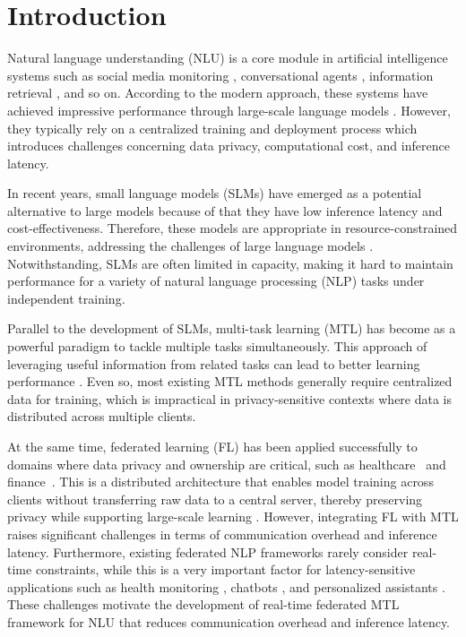 \section{Introduction} \label{sec:introduction}
Natural language understanding (NLU) is a core module in artificial intelligence systems such as social media monitoring \cite{arunkumar2025ai}, conversational agents \cite{manzo2025artificial}, information retrieval \cite{liu2025robust}, and so on. According to the modern approach, these systems have achieved impressive performance through large-scale language models \cite{devlin2019bert}. However, they typically rely on a centralized training and deployment process which introduces challenges concerning data privacy, computational cost, and inference latency. 

In recent years, small language models (SLMs) \cite{sanh2019distilbert, turc2019well, wang2020minilm} have emerged as a potential alternative to large models because of that they have low inference latency and cost-effectiveness. Therefore, these models are appropriate in resource-constrained environments, addressing the challenges of large language models \cite{li2020federated}. Notwithstanding, SLMs are often limited in capacity, making it hard to maintain performance for a variety of natural language processing (NLP) tasks under independent training. 

Parallel to the development of SLMs, multi-task learning (MTL) \cite{ruder2017overview, caruana1997multitask} has become as a powerful paradigm to tackle multiple tasks simultaneously. This approach of leveraging useful information from related tasks can lead to better learning performance \cite{wang2018glue, yu2020gradient}. Even so, most existing MTL methods generally require centralized data for training, which is impractical in privacy-sensitive contexts where data is distributed across multiple clients. 

At the same time, federated learning (FL) has been applied successfully to domains where data privacy and ownership are critical, such as healthcare~\cite{dayan2021federated} and finance~\cite{long2020federated}. This is a distributed architecture that  enables model training across clients without transferring raw data to a central server, thereby preserving privacy while supporting large-scale learning \cite{mcmahan2017communication, yang2019federated}. 
However, integrating FL with MTL raises significant challenges in terms of communication overhead and inference latency. Furthermore, existing federated NLP frameworks \cite{rani2025privacy, kumar2025federated, cai2023efficient} rarely consider real-time constraints, while this is a very important factor for latency-sensitive applications such as health monitoring \cite{sharma2025smart}, chatbots \cite{kanagajothi2025enhancing}, and personalized assistants \cite{mok2025exploring}. 
These challenges motivate the development of real-time federated MTL framework for NLU that reduces communication overhead and inference latency.

